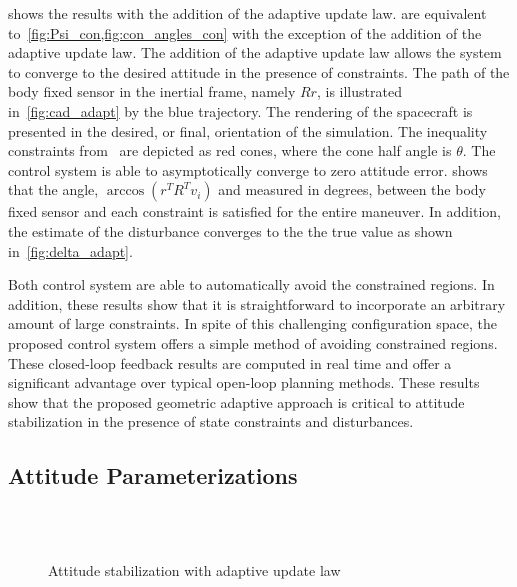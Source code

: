 \documentclass[10pt,fleqn]{IJCAS}  %
\begin{document}
\begin{multicols}{2}
 shows the results with the addition of the adaptive update law.
 are equivalent to~\cref{fig:Psi_con,fig:con_angles_con} with the exception of the addition of the adaptive update law.
The addition of the adaptive update law allows the system to converge to the desired attitude in the presence of constraints.
The path of the body fixed sensor in the inertial frame, namely \( R r \), is illustrated in~\cref{fig:cad_adapt} by the blue trajectory.
The rendering of the spacecraft is presented in the desired, or final, orientation of the simulation.
The inequality constraints from~ are depicted as red cones, where the cone half angle is \( \theta \).
The control system is able to asymptotically converge to zero attitude error.
 shows that the angle, \( \arccos(r^T R^T v_i) \) and measured in degrees, between the body fixed sensor and each constraint is satisfied for the entire maneuver.
In addition, the estimate of the disturbance converges to the the true value as shown in~\cref{fig:delta_adapt}.

Both control system are able to automatically avoid the constrained regions. 
In addition, these results show that it is straightforward to incorporate an arbitrary amount of large constraints.
In spite of this challenging configuration space, the proposed control system offers a simple method of avoiding constrained regions.
These closed-loop feedback results are computed in real time and offer a significant advantage over typical open-loop planning methods.
These results show that the proposed geometric adaptive approach is critical to attitude stabilization in the presence of state constraints and disturbances.

\subsection{Attitude Parameterizations}\label{ssec:attitude_parameterization}
\end{multicols}
\begin{figure} 
  \centering 
    ~
    \\
    ~
  \caption{Attitude stabilization with adaptive update law}
  \label{fig:adapt} 
\end{figure}
\end{document}
